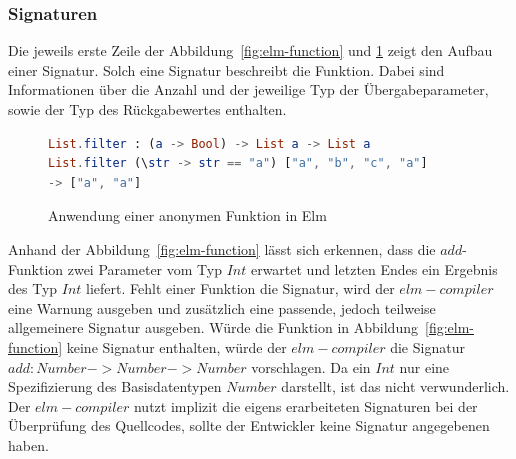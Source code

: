 \subsubsection{Signaturen}
\label{sec:Signaturen}
Die jeweils erste Zeile der Abbildung~\ref{fig:elm-function} und \ref{fig:elm-anonym-function} zeigt den Aufbau einer Signatur. Solch eine Signatur beschreibt die Funktion. Dabei sind Informationen über die Anzahl und der jeweilige Typ der Übergabeparameter, sowie der Typ des Rückgabewertes enthalten.
\begin{figure}[h]
\begin{lstlisting}[language=Elm]
List.filter : (a -> Bool) -> List a -> List a
List.filter (\str -> str == "a") ["a", "b", "c", "a"]
-> ["a", "a"]
\end{lstlisting}
\caption{Anwendung einer anonymen Funktion in Elm}\label{fig:elm-anonym-function}
\end{figure}
Anhand der Abbildung~\ref{fig:elm-function} lässt sich erkennen, dass die $add$-Funktion zwei Parameter vom Typ $Int$ erwartet und letzten Endes ein Ergebnis des Typ $Int$ liefert. Fehlt einer Funktion die Signatur, wird der $elm-compiler$ eine Warnung ausgeben und zusätzlich eine passende, jedoch teilweise allgemeinere Signatur ausgeben. Würde die Funktion in Abbildung~\ref{fig:elm-function} keine Signatur enthalten, würde der $elm-compiler$ die Signatur $add : Number -> Number -> Number$ vorschlagen. Da ein $Int$ nur eine Spezifizierung des Basisdatentypen $Number$ darstellt, ist das nicht verwunderlich. Der $elm-compiler$ nutzt implizit die eigens erarbeiteten Signaturen bei der Überprüfung des Quellcodes, sollte der Entwickler keine Signatur angegebenen haben.

